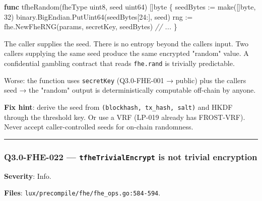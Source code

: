 \documentclass[
]{article}
\newenvironment{Shaded}{}{}
\newcommand{\BuiltInTok}[1]{\textcolor[rgb]{0.00,0.50,0.00}{#1}}
\newcommand{\CommentTok}[1]{\textcolor[rgb]{0.38,0.63,0.69}{\textit{#1}}}
\newcommand{\DataTypeTok}[1]{\textcolor[rgb]{0.56,0.13,0.00}{#1}}
\newcommand{\DecValTok}[1]{\textcolor[rgb]{0.25,0.63,0.44}{#1}}
\newcommand{\KeywordTok}[1]{\textcolor[rgb]{0.00,0.44,0.13}{\textbf{#1}}}
\newcommand{\NormalTok}[1]{#1}
\newcommand{\OperatorTok}[1]{\textcolor[rgb]{0.40,0.40,0.40}{#1}}
\begin{document}
\begin{Shaded}
\begin{Highlighting}[]
\KeywordTok{func}\NormalTok{ tfheRandom}\OperatorTok{(}\NormalTok{fheType }\DataTypeTok{uint8}\OperatorTok{,}\NormalTok{ seed }\DataTypeTok{uint64}\OperatorTok{)} \OperatorTok{[]}\DataTypeTok{byte} \OperatorTok{\{}
\NormalTok{    seedBytes }\OperatorTok{:=} \BuiltInTok{make}\OperatorTok{([]}\DataTypeTok{byte}\OperatorTok{,} \DecValTok{32}\OperatorTok{)}
\NormalTok{    binary}\OperatorTok{.}\NormalTok{BigEndian}\OperatorTok{.}\NormalTok{PutUint64}\OperatorTok{(}\NormalTok{seedBytes}\OperatorTok{[}\DecValTok{24}\OperatorTok{:],}\NormalTok{ seed}\OperatorTok{)}
\NormalTok{    rng }\OperatorTok{:=}\NormalTok{ fhe}\OperatorTok{.}\NormalTok{NewFheRNG}\OperatorTok{(}\NormalTok{params}\OperatorTok{,}\NormalTok{ secretKey}\OperatorTok{,}\NormalTok{ seedBytes}\OperatorTok{)}
    \CommentTok{// ...}
\OperatorTok{\}}
\end{Highlighting}
\end{Shaded}

The caller supplies the seed. There is no entropy beyond the
caller\textquotesingle s input. Two callers supplying the same seed
produce the same encrypted "random" value. A confidential gambling
contract that reads \texttt{fhe.rand} is trivially predictable.

Worse: the function uses \texttt{secretKey} (Q3.0-FHE-001 → public) plus
the caller\textquotesingle s seed → the "random" output is
deterministically computable off-chain by anyone.

\textbf{Fix hint}: derive the seed from
\texttt{(blockhash,\ tx\_hash,\ salt)} and HKDF through the threshold
key. Or use a VRF (LP-019 already has FROST-VRF). Never accept
caller-controlled seeds for on-chain randomness.

\begin{center}\rule{0.5\linewidth}{0.5pt}\end{center}

\subsubsection{\texorpdfstring{Q3.0-FHE-022 ---
\texttt{tfheTrivialEncrypt} is not trivial
encryption}{Q3.0-FHE-022 --- tfheTrivialEncrypt is not trivial encryption}}\label{q30-fhe-022--tfhetrivialencrypt-is-not-trivial-encryption}

\textbf{Severity}: Info.

\textbf{Files}: \texttt{lux/precompile/fhe/fhe\_ops.go:584-594}.
\end{document}
